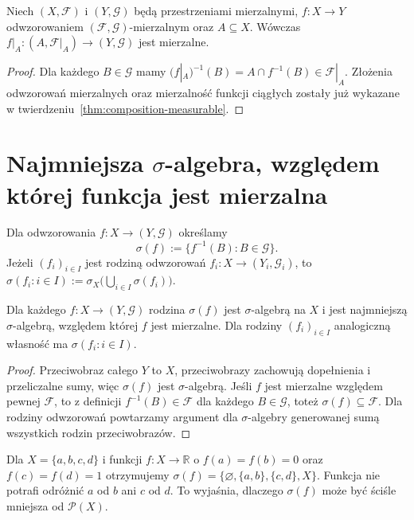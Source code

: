 \begin{twierdzenie}
\label{thm:restriction-meas-5}
Niech $(X,\mathcal F)$ i $(Y,\mathcal G)$ będą przestrzeniami
mierzalnymi, $f:X\to Y$ odwzorowaniem
$(\mathcal F,\mathcal G)$-mierzalnym oraz $A\subseteq X$.
Wówczas $f|_A:(A,\mathcal F|_A)\to(Y,\mathcal G)$ jest mierzalne.
\end{twierdzenie}
\begin{proof}
Dla każdego $B\in\mathcal G$ mamy
$(f|_A)^{-1}(B)=A\cap f^{-1}(B)\in\mathcal F|_A$.
Złożenia odwzorowań mierzalnych oraz mierzalność funkcji
ciągłych zostały już wykazane w twierdzeniu~\ref{thm:composition-measurable}.
\end{proof}

\section{Najmniejsza \texorpdfstring{$\sigma$}{sigma}-algebra, względem której funkcja jest mierzalna}

\begin{definicja}
\label{def:sigma-of-function}
Dla odwzorowania $f:X\to(Y,\mathcal G)$ określamy
\[
\sigma(f):=\{f^{-1}(B):B\in\mathcal G\}.
\]
Jeżeli $(f_i)_{i\in I}$ jest rodziną odwzorowań
$f_i:X\to(Y_i,\mathcal G_i)$, to
$\sigma(f_i:i\in I):=\sigma_X\bigl(\bigcup_{i\in I}\sigma(f_i)\bigr)$.
\end{definicja}

\begin{twierdzenie}
\label{thm:initial-sigma}
Dla każdego $f:X\to(Y,\mathcal G)$ rodzina $\sigma(f)$
jest $\sigma$-algebrą na $X$ i jest najmniejszą
$\sigma$-algebrą, względem której $f$ jest mierzalne.
Dla rodziny $(f_i)_{i\in I}$ analogiczną własność
ma $\sigma(f_i:i\in I)$.
\end{twierdzenie}
\begin{proof}
Przeciwobraz całego $Y$ to $X$, przeciwobrazy zachowują
dopełnienia i przeliczalne sumy, więc $\sigma(f)$
jest $\sigma$-algebrą. Jeśli $f$ jest mierzalne
względem pewnej $\mathcal F$, to z definicji
$f^{-1}(B)\in\mathcal F$ dla każdego $B\in\mathcal G$,
toteż $\sigma(f)\subseteq\mathcal F$.
Dla rodziny odwzorowań powtarzamy argument dla
$\sigma$-algebry generowanej sumą wszystkich
rodzin przeciwobrazów.
\end{proof}

\begin{przyklad}
Dla $X=\{a,b,c,d\}$ i funkcji $f:X\to\mathbb R$ o
$f(a)=f(b)=0$ oraz $f(c)=f(d)=1$ otrzymujemy
$\sigma(f)=\{\varnothing,\{a,b\},\{c,d\},X\}$.
Funkcja nie potrafi odróżnić $a$ od $b$ ani $c$ od $d$.
To wyjaśnia, dlaczego $\sigma(f)$ może być ściśle mniejsza
od $\mathcal P(X)$.
\end{przyklad}

